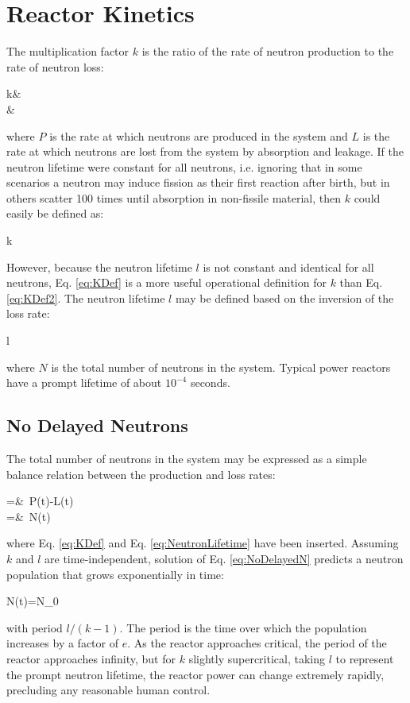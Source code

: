 \section{Reactor Kinetics}
\label{sec:Kinetics}

The multiplication factor \(k\) is the ratio of the rate of neutron production to the rate of neutron loss:

\beqa
\label{eq:KDef}
k\equiv&\\
\equiv&
\eeqa

where \(P\) is the rate at which neutrons are produced in the system and \(L\) is the rate at which neutrons are lost from the system by absorption and leakage. If the neutron lifetime were constant for all neutrons, i.e. ignoring that in some scenarios a neutron may induce fission as their first reaction after birth, but in others scatter 100 times until absorption in non-fissile material, then \(k\) could easily be defined as:

\beq
\label{eq:KDef2}
k\equiv{}
\eeq

However, because the neutron lifetime \(l\) is not constant and identical for all neutrons, Eq. \eqref{eq:KDef} is a more useful operational definition for \(k\) than Eq. \eqref{eq:KDef2}. The neutron lifetime \(l\) may be defined based on the inversion of the loss rate:

\beq
\label{eq:NeutronLifetime}
l\equiv{}
\eeq

where \(N\) is the total number of neutrons in the system. Typical power reactors have a prompt lifetime of about \(10^{-4}\) seconds. 

\subsection{No Delayed Neutrons}

The total number of neutrons in the system may be expressed as a simple balance relation between the production and loss rates:

\beqa
\label{eq:NoDelayedN}
=&\ P(t)-L(t)\\
=&\ N(t)
\eeqa

where Eq. \eqref{eq:KDef} and Eq. \eqref{eq:NeutronLifetime} have been inserted. Assuming \(k\) and \(l\) are time-independent, solution of Eq. \eqref{eq:NoDelayedN} predicts a neutron population that grows exponentially in time:

\beq
N(t)=N_0
\eeq

with period \(l/(k-1)\). The period is the time over which the population increases by a factor of \(e\). As the reactor approaches critical, the period of the reactor approaches infinity, but for \(k\) slightly supercritical, taking \(l\) to represent the prompt neutron lifetime, the reactor power can change extremely rapidly, precluding any reasonable human control.